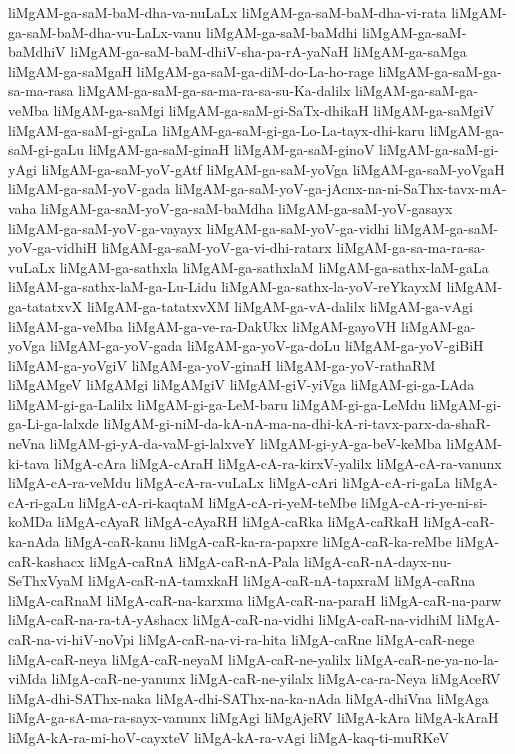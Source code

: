 {liMgAM-ga-saM-baM-dha-va-nuLaLx
liMgAM-ga-saM-baM-dha-vi-rata
liMgAM-ga-saM-baM-dha-vu-LaLx-vanu
liMgAM-ga-saM-baMdhi
liMgAM-ga-saM-baMdhiV
liMgAM-ga-saM-baM-dhiV-sha-pa-rA-yaNaH
liMgAM-ga-saMga
liMgAM-ga-saMgaH
liMgAM-ga-saM-ga-diM-do-La-ho-rage
liMgAM-ga-saM-ga-sa-ma-rasa
liMgAM-ga-saM-ga-sa-ma-ra-sa-su-Ka-dalilx
liMgAM-ga-saM-ga-veMba
liMgAM-ga-saMgi
liMgAM-ga-saM-gi-SaTx-dhikaH
liMgAM-ga-saMgiV
liMgAM-ga-saM-gi-gaLa
liMgAM-ga-saM-gi-ga-Lo-La-tayx-dhi-karu
liMgAM-ga-saM-gi-gaLu
liMgAM-ga-saM-ginaH
liMgAM-ga-saM-ginoV
liMgAM-ga-saM-gi-yAgi
liMgAM-ga-saM-yoV-gAtf
liMgAM-ga-saM-yoVga
liMgAM-ga-saM-yoVgaH
liMgAM-ga-saM-yoV-gada
liMgAM-ga-saM-yoV-ga-jAcnx-na-ni-SaThx-tavx-mA-vaha
liMgAM-ga-saM-yoV-ga-saM-baMdha
liMgAM-ga-saM-yoV-gasayx
liMgAM-ga-saM-yoV-ga-vayayx
liMgAM-ga-saM-yoV-ga-vidhi
liMgAM-ga-saM-yoV-ga-vidhiH
liMgAM-ga-saM-yoV-ga-vi-dhi-ratarx
liMgAM-ga-sa-ma-ra-sa-vuLaLx
liMgAM-ga-sathxla
liMgAM-ga-sathxlaM
liMgAM-ga-sathx-laM-gaLa
liMgAM-ga-sathx-laM-ga-Lu-Lidu
liMgAM-ga-sathx-la-yoV-reYkayxM
liMgAM-ga-tatatxvX
liMgAM-ga-tatatxvXM
liMgAM-ga-vA-dalilx
liMgAM-ga-vAgi
liMgAM-ga-veMba
liMgAM-ga-ve-ra-DakUkx
liMgAM-gayoVH
liMgAM-ga-yoVga
liMgAM-ga-yoV-gada
liMgAM-ga-yoV-ga-doLu
liMgAM-ga-yoV-giBiH
liMgAM-ga-yoVgiV
liMgAM-ga-yoV-ginaH
liMgAM-ga-yoV-rathaRM
liMgAMgeV
liMgAMgi
liMgAMgiV
liMgAM-giV-yiVga
liMgAM-gi-ga-LAda
liMgAM-gi-ga-Lalilx
liMgAM-gi-ga-LeM-baru
liMgAM-gi-ga-LeMdu
liMgAM-gi-ga-Li-ga-lalxde
liMgAM-gi-niM-da-kA-nA-ma-na-dhi-kA-ri-tavx-parx-da-shaR-neVna
liMgAM-gi-yA-da-vaM-gi-lalxveY
liMgAM-gi-yA-ga-beV-keMba
liMgAM-ki-tava
liMgA-cAra
liMgA-cAraH
liMgA-cA-ra-kirxV-yalilx
liMgA-cA-ra-vanunx
liMgA-cA-ra-veMdu
liMgA-cA-ra-vuLaLx
liMgA-cAri
liMgA-cA-ri-gaLa
liMgA-cA-ri-gaLu
liMgA-cA-ri-kaqtaM
liMgA-cA-ri-yeM-teMbe
liMgA-cA-ri-ye-ni-si-koMDa
liMgA-cAyaR
liMgA-cAyaRH
liMgA-caRka
liMgA-caRkaH
liMgA-caR-ka-nAda
liMgA-caR-kanu
liMgA-caR-ka-ra-papxre
liMgA-caR-ka-reMbe
liMgA-caR-kashacx
liMgA-caRnA
liMgA-caR-nA-Pala
liMgA-caR-nA-dayx-nu-SeThxVyaM
liMgA-caR-nA-tamxkaH
liMgA-caR-nA-tapxraM
liMgA-caRna
liMgA-caRnaM
liMgA-caR-na-karxma
liMgA-caR-na-paraH
liMgA-caR-na-parw
liMgA-caR-na-ra-tA-yAshacx
liMgA-caR-na-vidhi
liMgA-caR-na-vidhiM
liMgA-caR-na-vi-hiV-noVpi
liMgA-caR-na-vi-ra-hita
liMgA-caRne
liMgA-caR-nege
liMgA-caR-neya
liMgA-caR-neyaM
liMgA-caR-ne-yalilx
liMgA-caR-ne-ya-no-la-viMda
liMgA-caR-ne-yanunx
liMgA-caR-ne-yilalx
liMgA-ca-ra-Neya
liMgAceRV
liMgA-dhi-SAThx-naka
liMgA-dhi-SAThx-na-ka-nAda
liMgA-dhiVna
liMgAga
liMgA-ga-sA-ma-ra-sayx-vanunx
liMgAgi
liMgAjeRV
liMgA-kAra
liMgA-kAraH
liMgA-kA-ra-mi-hoV-cayxteV
liMgA-kA-ra-vAgi
liMgA-kaq-ti-muRKeV
}
